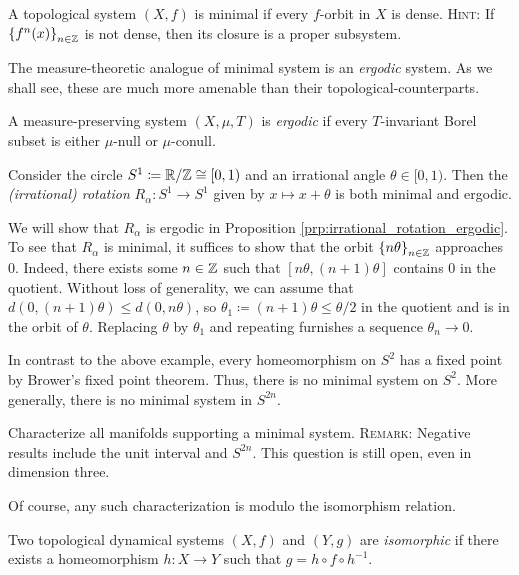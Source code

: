 \documentclass[reqno, twoside]{article}
\begin{document}
    \begin{exercise}
        A topological system $(X,f)$ is minimal if every $f$-orbit in $X$ is dense. \textsc{Hint:} If $\left\{f^n(x)\right\}_{n\in\mathbb{Z}}$ is not dense, then its closure is a proper subsystem.
    \end{exercise}

    The measure-theoretic analogue of minimal system is an \textit{ergodic} system. As we shall see, these are much more amenable than their topological-counterparts.

    \begin{definition}
        A measure-preserving system $(X,\mu,T)$ is \textit{ergodic} if every $T$-invariant Borel subset is either $\mu$-null or $\mu$-conull.
    \end{definition}

    \begin{example}
        Consider the circle $S^1\coloneqq\mathbb{R}/\mathbb{Z}\cong[0,1)$ and an irrational angle $\theta\in[0,1)$. Then the \textit{(irrational) rotation} $R_\alpha:S^1\to S^1$ given by $x\mapsto x+\theta$ is both minimal and ergodic.

        We will show that $R_\alpha$ is ergodic in Proposition \ref{prp:irrational_rotation_ergodic}. To see that $R_\alpha$ is minimal, it suffices to show that the orbit $\left\{n\theta\right\}_{n\in\mathbb{Z}}$ approaches $0$. Indeed, there exists some $n\in\mathbb{Z}$ such that $[n\theta,(n+1)\theta]$ contains $0$ in the quotient. Without loss of generality, we can assume that $d(0,(n+1)\theta)\leq d(0,n\theta)$, so $\theta_1\coloneqq(n+1)\theta\leq\theta/2$ in the quotient and is in the orbit of $\theta$. Replacing $\theta$ by $\theta_1$ and repeating furnishes a sequence $\theta_n\to0$.
    \end{example}

    In contrast to the above example, every homeomorphism on $S^2$ has a fixed point by Brower's fixed point theorem. Thus, there is no minimal system on $S^2$. More generally, there is no minimal system in $S^{2n}$.

    \begin{open}
        Characterize all manifolds supporting a minimal system. \textsc{Remark:} Negative results include the unit interval and $S^{2n}$. This question is still open, even in dimension three.
    \end{open}

    Of course, any such characterization is modulo the isomorphism relation.

    \begin{definition}
        Two topological dynamical systems $(X,f)$ and $(Y,g)$ are \textit{isomorphic} if there exists a homeomorphism $h:X\to Y$ such that $g=h\circ f\circ h^{-1}$.
    \end{definition}
\end{document}
